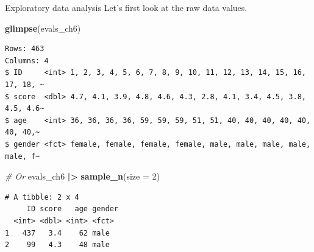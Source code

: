 \documentclass[
  ignorenonframetext,
]{beamer}
\newenvironment{Shaded}{\begin{snugshade}}{\end{snugshade}}
\newcommand{\AttributeTok}[1]{\textcolor[rgb]{0.13,0.29,0.53}{#1}}
\newcommand{\CommentTok}[1]{\textcolor[rgb]{0.56,0.35,0.01}{\textit{#1}}}
\newcommand{\DecValTok}[1]{\textcolor[rgb]{0.00,0.00,0.81}{#1}}
\newcommand{\FunctionTok}[1]{\textcolor[rgb]{0.13,0.29,0.53}{\textbf{#1}}}
\newcommand{\NormalTok}[1]{#1}
\newcommand{\SpecialCharTok}[1]{\textcolor[rgb]{0.81,0.36,0.00}{\textbf{#1}}}
\begin{document}
\begin{frame}[fragile]{Exploratory data analysis}
\protect\hypertarget{exploratory-data-analysis-9}{}
Let's first look at the raw data values.

\small

\begin{Shaded}
\begin{Highlighting}[]
\FunctionTok{glimpse}\NormalTok{(evals\_ch6)}
\end{Highlighting}
\end{Shaded}

\begin{verbatim}
Rows: 463
Columns: 4
$ ID     <int> 1, 2, 3, 4, 5, 6, 7, 8, 9, 10, 11, 12, 13, 14, 15, 16, 17, 18, ~
$ score  <dbl> 4.7, 4.1, 3.9, 4.8, 4.6, 4.3, 2.8, 4.1, 3.4, 4.5, 3.8, 4.5, 4.6~
$ age    <int> 36, 36, 36, 36, 59, 59, 59, 51, 51, 40, 40, 40, 40, 40, 40, 40,~
$ gender <fct> female, female, female, female, male, male, male, male, male, f~
\end{verbatim}

\begin{Shaded}
\begin{Highlighting}[]
\CommentTok{\# Or}
\NormalTok{evals\_ch6 }\SpecialCharTok{|\textgreater{}} 
  \FunctionTok{sample\_n}\NormalTok{(}\AttributeTok{size =} \DecValTok{2}\NormalTok{)}
\end{Highlighting}
\end{Shaded}

\begin{verbatim}
# A tibble: 2 x 4
     ID score   age gender
  <int> <dbl> <int> <fct> 
1   437   3.4    62 male  
2    99   4.3    48 male  
\end{verbatim}

\normalsize
\end{frame}
\end{document}
